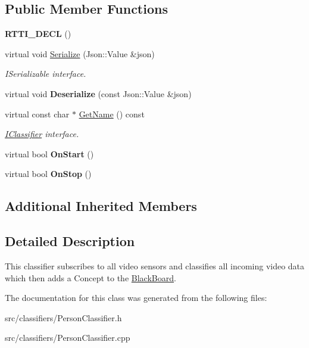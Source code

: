 \subsection*{Public Member Functions}
\begin{DoxyCompactItemize}
\item 
\mbox{\label{class_person_classifier_a1612e8fd41c9485ca916cd4ef07b8d2a}} 
{\bfseries R\+T\+T\+I\+\_\+\+D\+E\+CL} ()
\item 
\mbox{\label{class_person_classifier_ae6eccd50dd6de5e733eb296ba5a04a09}} 
virtual void \hyperlink{class_person_classifier_ae6eccd50dd6de5e733eb296ba5a04a09}{Serialize} (Json\+::\+Value \&json)
\begin{DoxyCompactList}\small\item\em I\+Serializable interface. \end{DoxyCompactList}\item 
\mbox{\label{class_person_classifier_a6d83bc616e42039cab21631ae92bad36}} 
virtual void {\bfseries Deserialize} (const Json\+::\+Value \&json)
\item 
\mbox{\label{class_person_classifier_a3aed9c226298960c9d26d067c33ba2c9}} 
virtual const char $\ast$ \hyperlink{class_person_classifier_a3aed9c226298960c9d26d067c33ba2c9}{Get\+Name} () const
\begin{DoxyCompactList}\small\item\em \hyperlink{class_i_classifier}{I\+Classifier} interface. \end{DoxyCompactList}\item 
\mbox{\label{class_person_classifier_a2398321bedc307629d28bafee819d545}} 
virtual bool {\bfseries On\+Start} ()
\item 
\mbox{\label{class_person_classifier_a3feb20c47b1a47a5c50491e03cbdb75e}} 
virtual bool {\bfseries On\+Stop} ()
\end{DoxyCompactItemize}
\subsection*{Additional Inherited Members}


\subsection{Detailed Description}
This classifier subscribes to all video sensors and classifies all incoming video data which then adds a Concept to the \hyperlink{class_black_board}{Black\+Board}. 

The documentation for this class was generated from the following files\+:\begin{DoxyCompactItemize}
\item 
src/classifiers/Person\+Classifier.\+h\item 
src/classifiers/Person\+Classifier.\+cpp\end{DoxyCompactItemize}
